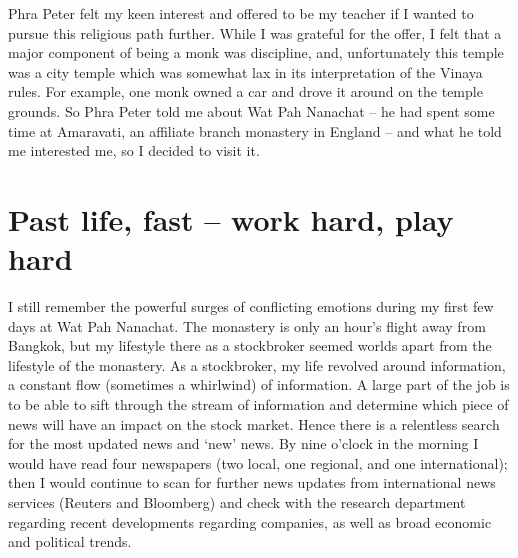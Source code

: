 Phra Peter felt my keen interest and offered to be my teacher if I
wanted to pursue this religious path further. While I was grateful for
the offer, I felt that a major component of being a monk was discipline, 
and, unfortunately this temple was a city temple which was somewhat lax
in its interpretation of the Vinaya rules. For example, one monk owned a
car and drove it around on the temple grounds. So Phra Peter told me
about Wat Pah Nanachat -- he had spent some time at Amaravati, an
affiliate branch monastery in England -- and what he told me interested
me, so I decided to visit it. 

\section{Past life, fast -- work hard, play hard}

I still remember the powerful surges of conflicting emotions during my
first few days at Wat Pah Nanachat. The monastery is only an hour's
flight away from Bangkok, but my lifestyle there as a
stockbroker seemed worlds apart from the lifestyle of the monastery. As
a stockbroker, my life revolved around information, a constant flow
 (sometimes a whirlwind) of information. A large part of the job is to be
able to sift through the stream of information and determine which piece
of news will have an impact on the stock market. Hence there is a
relentless search for the most updated news and `new' news. By nine
o'clock in the morning I would have read four newspapers (two local, one
regional, and one international); then I would continue to scan for
further news updates from international news services (Reuters and
Bloomberg) and check with the research department regarding recent
developments regarding companies, as well as broad economic and
political trends. 

